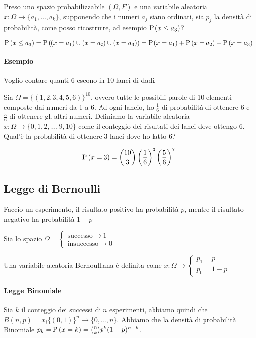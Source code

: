 Preso uno spazio probabilizzabile $ (\Omega, F) $ e una variabile aleatoria $ x : \Omega \to \{ a_1, \dots, a_k \} $, supponendo che i numeri $ a_j $ siano ordinati, sia $ p_j $ la densità di probabilità, come posso ricostruire, ad esempio $ \text{P}\left(x \leq a_3\right) $?

\[ \text{P}\left(x \leq a_3\right) = \text{P}\left((x=a_1) \cup (x=a_2) \cup (x=a_3)\right) = \text{P}\left(x = a_1\right) + \text{P}\left(x = a_2\right) + \text{P}\left(x = a_3\right)  \]

\paragraph{Esempio}

Voglio contare quanti 6 escono in 10 lanci di dadi.

Sia $ \Omega = \{ (1, 2, 3, 4, 5, 6)\}^{10} $, ovvero tutte le possibili parole di 10 elementi composte dai numeri da 1 a 6. Ad ogni lancio, ho $ \frac{1}{6} $ di probabilità di ottenere 6 e $ \frac{5}{6} $ di ottenere gli altri numeri. Definiamo la variabile aleatoria $ x : \Omega \to \{ 0, 1, 2, \dots, 9, 10 \} $ come il conteggio dei risultati dei lanci dove ottengo 6. Qual'è la probabilità di ottenere 3 lanci dove ho fatto 6?

\[ \text{P}\left(x = 3\right) = \binom{10}{3} \left(\dfrac{1}{6}\right)^3 \left(\dfrac{5}{6}\right)^7 \]


\subsection{Legge di Bernoulli}
Faccio un esperimento, il risultato positivo ha probabilità $ p $, mentre il risultato negativo ha probabilità $ 1 - p $

Sia lo spazio $ \Omega = \begin{cases}
\text{successo} \to 1 \\
\text{insuccesso} \to 0
\end{cases} $

Una variabile aleatoria Bernoulliana è definita come $ x : \Omega \to \begin{cases}
p_1 = p \\ p_0 = 1 - p
\end{cases} $

\paragraph{Legge Binomiale} 
Sia $ k $ il conteggio dei successi di $ n $ esperimenti, abbiamo quindi che $ B(n,p) = x_i\{(0,1)\}^n \to \{0, \dots, n\} $. Abbiamo che la densità di probabilità Binomiale $ p_k = \text{P}\left(x=k\right) = \binom{n}{k} p^k(1-p)^{n-k} $.

